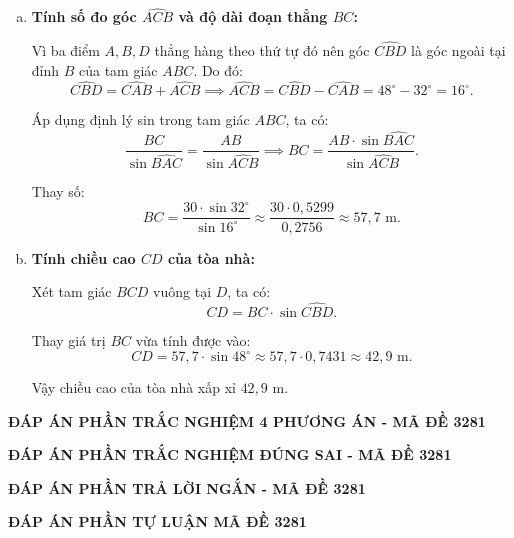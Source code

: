\begin{ex}
{		\begin{enumerate}[a)]
			\item \textbf{Tính số đo góc $\widehat{ACB}$ và độ dài đoạn thẳng $BC$:}
			
			Vì ba điểm $A, B, D$ thẳng hàng theo thứ tự đó nên góc $\widehat{CBD}$ là góc ngoài tại đỉnh $B$ của tam giác $ABC$. Do đó:
			$$\widehat{CBD} = \widehat{CAB} + \widehat{ACB} \implies \widehat{ACB} = \widehat{CBD} - \widehat{CAB} = 48^\circ - 32^\circ = 16^\circ.$$
			
			Áp dụng định lý sin trong tam giác $ABC$, ta có:
			$$\frac{BC}{\sin \widehat{BAC}} = \frac{AB}{\sin \widehat{ACB}} \implies BC = \frac{AB \cdot \sin \widehat{BAC}}{\sin \widehat{ACB}}.$$
			
			Thay số:
			$$BC = \frac{30 \cdot \sin 32^\circ}{\sin 16^\circ} \approx \frac{30 \cdot 0{,}5299}{0{,}2756} \approx 57{,}7\text{ m}.$$
			
			\item \textbf{Tính chiều cao $CD$ của tòa nhà:}
			
			Xét tam giác $BCD$ vuông tại $D$, ta có:
			$$CD = BC \cdot \sin \widehat{CBD}.$$
			
			Thay giá trị $BC$ vừa tính được vào:
			$$CD = 57{,}7 \cdot \sin 48^\circ \approx 57{,}7 \cdot 0{,}7431 \approx 42{,}9\text{ m}.$$
			
			Vậy chiều cao của tòa nhà xấp xỉ $42{,}9\text{ m}$.
		\end{enumerate}
	}
\end{ex}

\hetde
\label{3281}

\newpage
\begin{dapanMyLT}
\setcounter{page}{1}
\begin{center}
\bf ĐÁP ÁN PHẦN TRẮC NGHIỆM 4 PHƯƠNG ÁN - MÃ ĐỀ 3281\vspace{12pt}
\end{center}
\begin{center}
\bf ĐÁP ÁN PHẦN TRẮC NGHIỆM ĐÚNG SAI - MÃ ĐỀ 3281
\end{center}
\begin{center}
\bf ĐÁP ÁN PHẦN TRẢ LỜI NGẮN - MÃ ĐỀ 3281
\end{center}
\label{DA3281}
\begin{center}
\bf ĐÁP ÁN PHẦN TỰ LUẬN MÃ ĐỀ 3281
\end{center}

\clearpage
\end{dapanMyLT}




